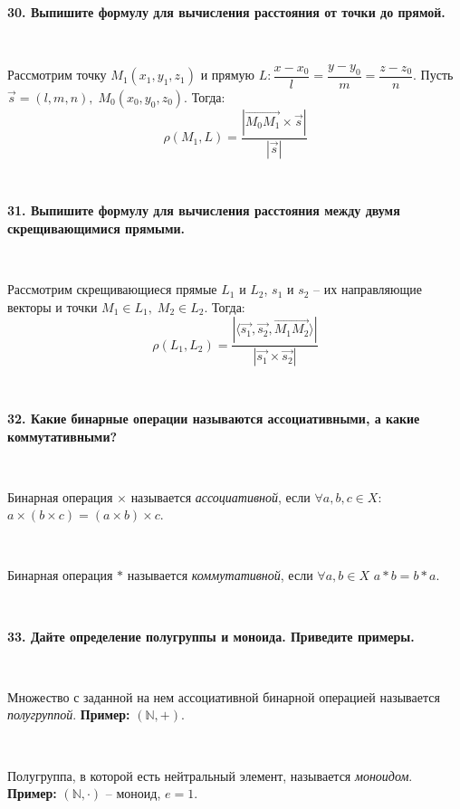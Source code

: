 \documentclass{article}
\begin{document}
	\textbf{30. Выпишите формулу для вычисления расстояния от точки до прямой.}
	
	{
		$\;$
		\setlength{\parindent}{0.4cm}
		\hangindent=0.4cm
		
		Рассмотрим точку $M_1(x_1, y_1, z_1)$ и прямую $L:\dfrac{x-x_0}{l}=\dfrac{y-y_0}{m}=\dfrac{z-z_0}{n}$. Пусть $\overrightarrow{s}=(l, m, n),\; M_0(x_0, y_0, z_0)$. Тогда: $$\rho(M_1, L)=\dfrac{|\overrightarrow{M_0M_1}\times\overrightarrow{s}|}{|\overrightarrow{s}|}$$
		
		$\;$
		\setlength{\parindent}{0cm}
		\hangindent=0cm
	}
	
	\textbf{31. Выпишите формулу для вычисления расстояния между двумя скрещивающимися прямыми.}
	
	{
		$\;$
		\setlength{\parindent}{0.4cm}
		\hangindent=0.4cm
		
		Рассмотрим скрещивающиеся прямые $L_1$ и $L_2$, $s_1$ и $s_2$ -- их направляющие векторы и точки $M_1\in L_1, \; M_2\in L_2$. Тогда: $$\rho(L_1, L_2)=\dfrac{|\langle\overrightarrow{s_1}, \overrightarrow{s_2}, \overrightarrow{M_1M_2}\rangle|}{|\overrightarrow{s_1}\times\overrightarrow{s_2}|}$$
		
		$\;$
		\setlength{\parindent}{0cm}
		\hangindent=0cm
	}
	
	\textbf{32. Какие бинарные операции называются ассоциативными, а какие коммутативными?}
	
	{
		$\;$
		\setlength{\parindent}{0.4cm}
		\hangindent=0.4cm
		
		Бинарная операция $\times$ называется \textit{ассоциативной}, если $\forall a, b, c\in X:$ $a\times(b\times c)=(a\times b)\times c$.
		
		$\;$
		
		Бинарная операция $\ast$ называется \textit{коммутативной}, если $\forall a, b\in X$ $a\ast b=b\ast a$.
		
		$\;$
		\setlength{\parindent}{0cm}
		\hangindent=0cm
	}
	
	\newpage
	
	\textbf{33. Дайте определение полугруппы и моноида. Приведите примеры.}
	
	{
		$\;$
		\setlength{\parindent}{0.4cm}
		\hangindent=0.4cm
		
		Множество с заданной на нем ассоциативной бинарной операцией называется \textit{полугруппой}. \textbf{Пример:} $(\mathbb{N}, +)$.
				
		$\;$
		
		Полугруппа, в которой есть нейтральный элемент, называется \textit{моноидом}. \textbf{Пример:} $(\mathbb{N}, \cdot)$ -- моноид, $e=1$.
		
		$\;$
		\setlength{\parindent}{0cm}
		\hangindent=0cm
	}
	
\end{document}
